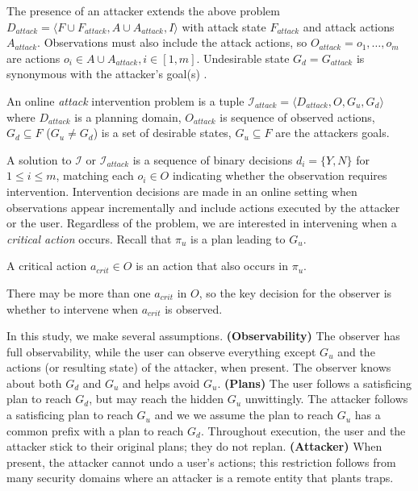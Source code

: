 The presence of an attacker extends the above problem $D_{attack}=\langle F \cup F_{attack}, A \cup A_{attack}, I \rangle$ with attack state $F_{attack}$ and attack actions $A_{attack}$.
Observations must also include the attack actions, so 
$O_{attack} = o_1, \ldots , o_m$ are actions $o_i \in A \cup A_{attack}, i \in[1,m]$.
Undesirable state $G_d = G_{attack}$ is synonymous with the attacker's goal(s) .
\theoremstyle{definition}
\begin{definition}
An \textnormal{online \emph{attack} intervention problem} is a tuple $\mathcal{I}_{attack} = \langle D_{attack}, O, G_u, G_d \rangle$ where $D_{attack}$ is a planning domain, 
$O_{attack}$ is  sequence of observed actions,
$G_d \subseteq F$ ($G_u \neq G_d$) is a set of desirable states,
$G_u \subseteq F$ are the attackers goals.
\end{definition}

A solution to $\mathcal{I}$ or $\mathcal{I}_{attack}$ is a sequence of binary decisions $d_i = \lbrace Y, N \rbrace$ for $1 \leq i \leq m$, matching each $o_i \in O$ indicating whether the observation requires intervention. 
Intervention decisions are made in an online setting when observations appear incrementally and include actions executed by the attacker or the user.
Regardless of the problem, we are interested in intervening when a \emph{critical action} occurs.
Recall that $\pi_u$ is a plan leading to $G_u$.
\begin{definition}
A \textnormal{critical action} $a_{crit} \in O$ is an action that also occurs in $\pi_u$.
\end{definition}
\noindent There may be more than one $a_{crit}$ in $O$, so the key decision for the observer is whether to intervene when $a_{crit}$ is observed.

In this study, we make several assumptions.
\textbf{(Observability)} 
The observer has full observability, while the user can observe everything except $G_u$ and the actions (or resulting state) of the attacker, when present.
The observer knows about both $G_d$ and $G_u$ and helps avoid $G_u$.
\textbf{(Plans)} 
The user follows a satisficing plan to reach $G_d$, but may reach the hidden $G_u$ unwittingly. 
The attacker follows a satisficing plan to reach $G_u$ and we we assume the plan to reach $G_u$ has a common prefix with a plan to reach $G_d$. 
Throughout execution, the user and the attacker stick to their original plans; they do not replan.
\textbf{(Attacker)}
When present, the attacker cannot undo a user's actions; this restriction follows from many security domains where an attacker is a remote entity that plants traps.


